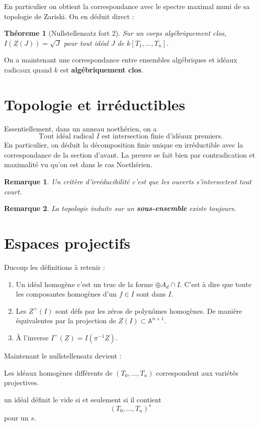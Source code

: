 \documentclass[a4paper,12pt]{book}
\newcommand{\A}{\mathbb{A}}
\theoremstyle{plain}
\newtheorem{thm}[subsection]{Théoreme}
\newtheorem{rem}{Remarque}
\theoremstyle{definition}
\theoremstyle{remark}
\begin{document}
En particulier on obtient la correspondance avec le spectre maximal
muni de sa topologie de Zariski. On en déduit direct :
\begin{thm}[Nullstellensatz fort 2]
    Sur un corps algébriquement clos, $I(Z(J))=\sqrt J$ pour tout idéal
    $J$ de $k[T_1,\ldots, T_n]$.
\end{thm}

On a maintenant une correspondance entre ensembles algébriques et
idéaux radicaux quand $k$ est \textbf{algébriquement clos}.
\section{Topologie et irréductibles}
Essentiellement, dans un anneau noethérien, on a 
\[\textrm{Tout idéal radical } I \textrm{ est intersection finie 
d'idéaux premiers.}\]
En particulier, on déduit la décomposition finie unique en irréductible
avec la correspondance de la section d'avant. La preuve se fait
bien par contradication et maximalité vu qu'on est dans le cas
Noethérien.
\begin{rem}
    Un critère d'irréducibilité c'est que les ouverts s'intersectent
    tout court.
\end{rem}
\begin{rem}
    La topologie induite sur un \textbf{sous-ensemble} existe toujours.
\end{rem}
\section{Espaces projectifs}
Ducoup les définitions à retenir :
\begin{enumerate}
    \item Un idéal homogène c'est un truc de la forme $\oplus A_d\cap I$.
	C'est à dire que toute les composantes homogènes d'un $f\in I$ 
	sont dans $I$.
    \item Les $Z^+(I)$ sont défs par les zéros de polynômes homogènes.
	De manière équivalentes par la projection de
	$Z(I)\subset \A^{n+1}$.
    \item À l'inverse $I^+(Z)=I(\pi^{-1}Z)$. 
\end{enumerate}
Maintenant le nullstellensatz devient :
\begin{center}
    Les idéaux homogènes différents de $(T_0,\ldots,T_n)$ correspondent
    aux variétés projectives.
\end{center}
un idéal définit le vide si et seulement si il contient
\[(T_0,\ldots,T_n)^s\] pour un $s$.
\end{document}
